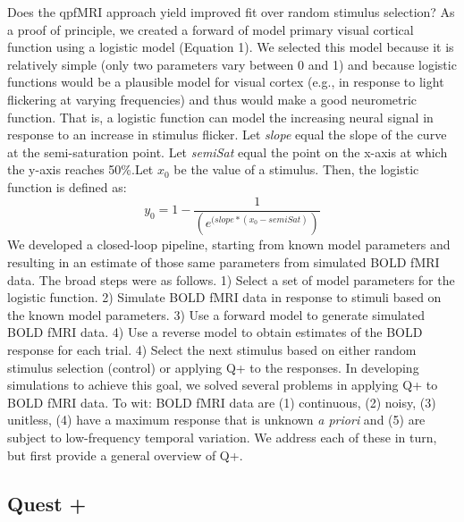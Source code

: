\documentclass[
  english,
  man,floatsintext]{apa6}
\begin{document}
Does the qpfMRI approach yield improved fit over random stimulus selection? As a proof of principle, we created a forward of model primary visual cortical function using a logistic model (Equation 1). We selected this model because it is relatively simple (only two parameters vary between 0 and 1) and because logistic functions would be a plausible model for visual cortex (e.g., in response to light flickering at varying frequencies) and thus would make a good neurometric function. That is, a logistic function can model the increasing neural signal in response to an increase in stimulus flicker. Let \emph{slope} equal the slope of the curve at the semi-saturation point. Let \emph{semiSat} equal the point on the x-axis at which the y-axis reaches 50\%.Let \(x_0\) be the value of a stimulus. Then, the logistic function is defined as:
\begin{equation}
  y_0 = 1-\frac{1}{(e^{(slope*(x_0-semiSat)})}
  \end{equation}
We developed a closed-loop pipeline, starting from known model parameters and resulting in an estimate of those same parameters from simulated BOLD fMRI data. The broad steps were as follows. 1) Select a set of model parameters for the logistic function. 2) Simulate BOLD fMRI data in response to stimuli based on the known model parameters. 3) Use a forward model to generate simulated BOLD fMRI data. 4) Use a reverse model to obtain estimates of the BOLD response for each trial. 4) Select the next stimulus based on either random stimulus selection (control) or applying Q+ to the responses.
In developing simulations to achieve this goal, we solved several problems in applying Q+ to BOLD fMRI data. To wit: BOLD fMRI data are (1) continuous, (2) noisy, (3) unitless, (4) have a maximum response that is unknown \emph{a priori} and (5) are subject to low-frequency temporal variation. We address each of these in turn, but first provide a general overview of Q+.

\hypertarget{quest}{%
\subsection{Quest +}\label{quest}}
\end{document}
